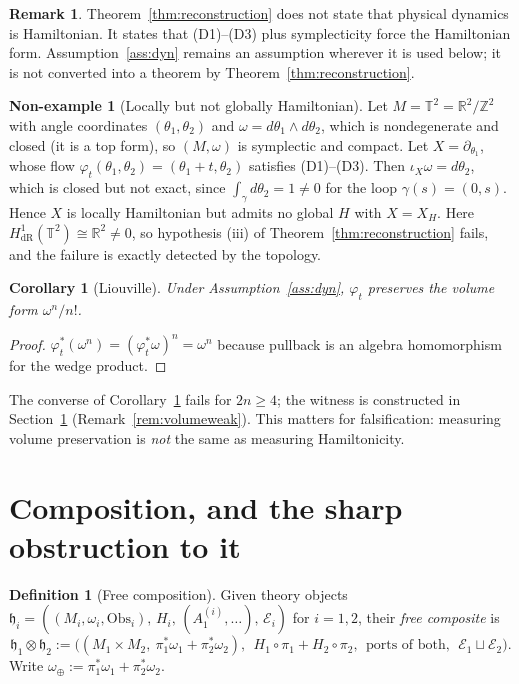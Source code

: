 \documentclass[10pt,a4paper]{article}
\theoremstyle{plain}
\newtheorem{corollary}[theorem]{Corollary}
\theoremstyle{definition}
\newtheorem{definition}[theorem]{Definition}
\newtheorem{nonexample}[theorem]{Non-example}
\newtheorem{remark}[theorem]{Remark}
\newcommand{\Obs}{\mathrm{Obs}}
\newcommand{\dR}{\mathrm{dR}}
\newcommand{\ins}{\iota}
\newcommand{\R}{\mathbb{R}}
\newcommand{\Zed}{\mathbb{Z}}
\begin{document}
\begin{remark}
\label{rem:nottheorem}
Theorem~\ref{thm:reconstruction} does not state that physical dynamics is Hamiltonian. It states that (D1)--(D3) plus symplecticity force the Hamiltonian form. Assumption~\ref{ass:dyn} remains an assumption wherever it is used below; it is not converted into a theorem by Theorem~\ref{thm:reconstruction}.
\end{remark}

\begin{nonexample}[Locally but not globally Hamiltonian]
\label{nonex:torus}
Let $M = \mathbb{T}^2 = \R^2/\Zed^2$ with angle coordinates $(\theta_1,\theta_2)$ and $\omega = d\theta_1\wedge d\theta_2$, which is nondegenerate and closed (it is a top form), so $(M,\omega)$ is symplectic and compact. Let $X = \partial_{\theta_1}$, whose flow $\varphi_t(\theta_1,\theta_2) = (\theta_1+t,\theta_2)$ satisfies (D1)--(D3). Then $\ins_X\omega = d\theta_2$, which is closed but not exact, since $\int_{\gamma} d\theta_2 = 1 \neq 0$ for the loop $\gamma(s) = (0,s)$. Hence $X$ is locally Hamiltonian but admits no global $H$ with $X = X_H$. Here $H^1_{\dR}(\mathbb{T}^2) \cong \R^2 \neq 0$, so hypothesis (iii) of Theorem~\ref{thm:reconstruction} fails, and the failure is exactly detected by the topology.
\end{nonexample}

\begin{corollary}[Liouville]
\label{cor:liouville}
Under Assumption~\ref{ass:dyn}, $\varphi_t$ preserves the volume form $\omega^n/n!$.
\end{corollary}
\begin{proof}
$\varphi_t^*(\omega^n) = (\varphi_t^*\omega)^n = \omega^n$ because pullback is an algebra homomorphism for the wedge product.
\end{proof}

The converse of Corollary~\ref{cor:liouville} fails for $2n \geq 4$; the witness is constructed in Section~\ref{sec:composition} (Remark~\ref{rem:volumeweak}). This matters for falsification: measuring volume preservation is \emph{not} the same as measuring Hamiltonicity.

\section{Composition, and the sharp obstruction to it}
\label{sec:composition}

\begin{definition}[Free composition]
\label{def:tensor}
Given theory objects $\mathfrak{h}_i = ((M_i,\omega_i,\Obs_i),\,H_i,\,(A^{(i)}_1,\dots),\,\mathcal{E}_i)$ for $i=1,2$, their \emph{free composite} is
\[
\mathfrak{h}_1\otimes\mathfrak{h}_2 := \big( (M_1\times M_2,\ \pi_1^*\omega_1 + \pi_2^*\omega_2),\ \ H_1\circ\pi_1 + H_2\circ\pi_2,\ \ \text{ports of both},\ \ \mathcal{E}_1 \sqcup \mathcal{E}_2 \big).
\]
Write $\omega_\oplus := \pi_1^*\omega_1 + \pi_2^*\omega_2$.
\end{definition}
\end{document}
